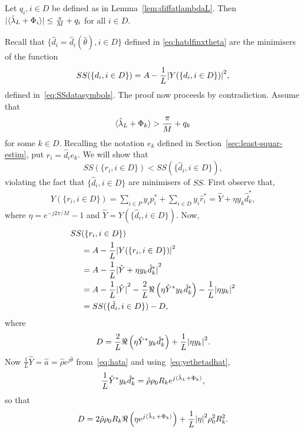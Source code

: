 \documentclass[journal]{IEEEtran}
\begin{document}
\begin{lemma}\label{lem:fracpartlambdahatnotpi} Let $q_i, i \in D$ be defined as in Lemma~\ref{lem:diffatlambdaL}.  Then ${\vert \langle \hat{\lambda}_L + \Phi_i \rangle \vert} \leq \frac{\pi}{M} + q_i$ for all $i \in D$.
\end{lemma}
\begin{IEEEproof}
Recall that $\{\hat{d}_i = \hat{d}_i(\hat{\theta}), i \in D\}$ defined in \eqref{eq:hatdfinxtheta} are the minimisers of the function 
\[
SS(\{d_i, i \in D\}) = A - \frac{1}{L}{\vert Y(\{d_i, i \in D\}) \vert}^2,
\]
defined in~\eqref{eq:SSdatasymbols}. The proof now proceeds by contradiction.  Assume that 
\begin{equation}\label{eq:fraclambassumption}
\langle \hat{\lambda}_L + \Phi_k \rangle > \frac{\pi}{M} + q_k
\end{equation}
for some $k \in D$.  Recalling the notation $e_k$ defined in Section~\ref{sec:least-squar-estim}, put $r_i = \hat{d}_i e_k$.  We will show that 
\[
SS(\{r_i, i \in D\}) < SS(\{\hat{d}_i, i \in D\}),
\]
violating the fact that $\{\hat{d}_i, i \in D\}$ are minimisers of $SS$.  First observe that,
\begin{align*}
Y(\{ r_i, i \in D\}) = \sum_{i \in P} y_ip_i^* + \sum_{i \in D} y_i\hat{r}_i^* = \hat{Y} + \eta y_k\hat{d}_k^*,
\end{align*}
where $\eta = e^{-j2\pi/M} - 1$ and $\hat{Y} = Y(\{ \hat{d}_i, i \in D\})$.  Now,
\begin{align*}
SS&(\{r_i, i \in D\}) \\
&= A - \frac{1}{L} {\vert  Y(\{ r_i, i \in D\})  \vert}^2 \\
&= A - \frac{1}{L} {\vert  \hat{Y} + \eta y_k\hat{d}_k^*  \vert}^2 \\
&= A - \frac{1}{L}{\vert \hat{Y} \vert}^2 - \frac{2}{L}\Re\left(\eta \hat{Y}^* y_k \hat{d}_k^* \right) -  \frac{1}{L}{\vert  \eta y_k \vert}^2\\
&= SS(\{\hat{d}_i, i \in D\}) - D,
\end{align*}
where 
\[
D = \frac{2}{L}\Re\left(\eta \hat{Y}^* y_k \hat{d}_k^* \right) +  \frac{1}{L}{\vert  \eta y_k  \vert}^2.
\]
Now $\frac{1}{L}\hat{Y} = \hat{a} = \hat{\rho} e^{j\hat{\theta}}$ from~\eqref{eq:hata} and using~\eqref{eq:yethetadhat},
\[
\frac{1}{L} \hat{Y}^* y_k \hat{d}_k^* = \hat{\rho} \rho_0 R_k e^{j\langle \hat{\lambda}_L + \Phi_k \rangle},
\]
so that
\begin{equation}\label{eq:Ddefn}
D = 2 \hat{\rho} \rho_0 R_k \Re\left( \eta e^{j\langle \hat{\lambda}_L + \Phi_k \rangle}\right) + \frac{1}{L}{\vert \eta \vert}^2\rho_0^2 R_k^2.
\end{equation}

\end{IEEEproof}
\end{document}
